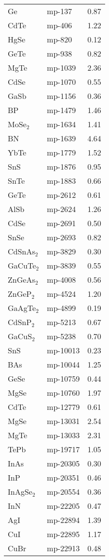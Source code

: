 \begin{center}
\begin{longtable}{M{3.0cm} M{3.0cm} M{3.5cm}}
\hline \hline
\endlastfoot
  Ge & mp-137 & 0.87\\
  CdTe & mp-406 & 1.22\\
  HgSe & mp-820 & 0.12\\
  GeTe & mp-938 & 0.82\\
  MgTe & mp-1039 & 2.36\\
  CdSe & mp-1070 & 0.55\\
  GaSb & mp-1156 & 0.36\\
  BP & mp-1479 & 1.46\\
  MoSe$_2$ & mp-1634 & 1.41\\
  BN & mp-1639 & 4.64\\
  YbTe & mp-1779 & 1.52\\
  SnS & mp-1876 & 0.95\\
  SnTe & mp-1883 & 0.66\\
  GeTe & mp-2612 & 0.61\\
  AlSb & mp-2624 & 1.26\\
  CdSe & mp-2691 & 0.50\\
  SnSe & mp-2693 & 0.82\\
  CdSnAs$_2$ & mp-3829 & 0.30\\
  GaCuTe$_2$ & mp-3839 & 0.55\\
  ZnGeAs$_2$ & mp-4008 & 0.56\\
  ZnGeP$_2$ & mp-4524 & 1.20\\
  GaAgTe$_2$ & mp-4899 & 0.19\\
  CdSnP$_2$ & mp-5213 & 0.67\\
  GaCuS$_2$ & mp-5238 & 0.70\\
  SnS & mp-10013 & 0.23\\
  BAs & mp-10044 & 1.25\\
  GeSe & mp-10759 & 0.44\\
  MgSe & mp-10760 & 1.97\\
  CdTe & mp-12779 & 0.61\\
  MgSe & mp-13031 & 2.54\\
  MgTe & mp-13033 & 2.31\\
  TePb & mp-19717 & 1.05\\
  InAs & mp-20305 & 0.30\\
  InP & mp-20351 & 0.46\\
  InAgSe$_2$ & mp-20554 & 0.36\\
  InN & mp-22205 & 0.47\\
  AgI & mp-22894 & 1.39\\
  CuI & mp-22895 & 1.17\\
  CuBr & mp-22913 & 0.48\\

\end{longtable}
\end{center}
